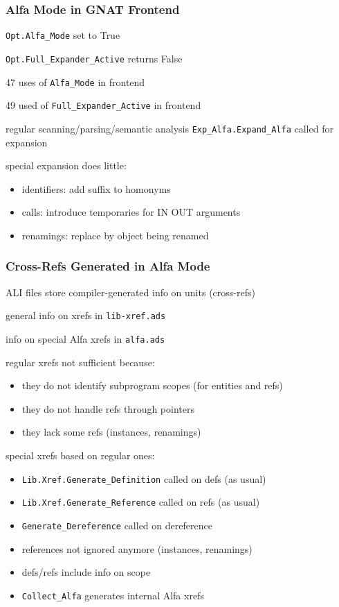 \documentclass{beamer}
\newcommand{\vs}{\vspace{0.5cm}}
\newenvironment{specialframe}{%
  \begin{frame}[fragile,environment=specialframe]}{\end{frame}}
\begin{document}
\begin{specialframe}
  \frametitle{Alfa Mode in GNAT Frontend}

\verb|Opt.Alfa_Mode| set to True

\verb|Opt.Full_Expander_Active| returns False

\vs

47 uses of \verb|Alfa_Mode| in frontend

49 used of \verb|Full_Expander_Active| in frontend

\vs

regular scanning/parsing/semantic analysis
\verb|Exp_Alfa.Expand_Alfa| called for expansion

\vs

special expansion does little:
\begin{itemize}
\item identifiers: add suffix to homonyms
\item calls: introduce temporaries for IN OUT arguments
\item renamings: replace by object being renamed
\end{itemize}

\end{specialframe}

\begin{specialframe}
  \frametitle{Cross-Refs Generated in Alfa Mode }

ALI files store compiler-generated info on units (cross-refs)

general info on xrefs in \verb|lib-xref.ads|

info on special Alfa xrefs in \verb|alfa.ads|

\vs

regular xrefs not sufficient because:
\begin{itemize}
\item they do not identify subprogram scopes (for entities and refs)
\item they do not handle refs through pointers
\item they lack some refs (instances, renamings)
\end{itemize}

\vs

special xrefs based on regular ones:
\begin{itemize}
\item \verb|Lib.Xref.Generate_Definition| called on defs (as usual)
\item \verb|Lib.Xref.Generate_Reference| called on refs (as usual)
\item \verb|Generate_Dereference| called on dereference
\item references not ignored anymore (instances, renamings)
\item defs/refs include info on scope
\item \verb|Collect_Alfa| generates internal Alfa xrefs
\end{itemize}

\end{specialframe}
\end{document}
